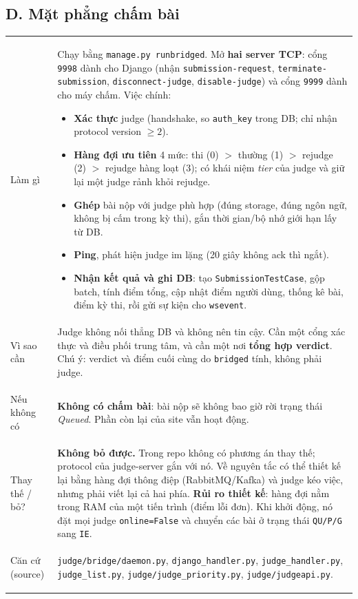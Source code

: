 \documentclass[11pt,a4paper]{article}
\makeatletter
\renewcommand{\c}[1]{\texttt{#1}}
\newcommand{\comp}[6]{%
\begin{tcolorbox}[enhanced,breakable,colback=white,colframe=black!55,boxrule=0.5pt,arc=2pt,
  title={\textbf{#1}},fonttitle=\large,left=4pt,right=4pt,top=3pt,bottom=3pt]
\begin{tabularx}{\linewidth}{@{}>{\bfseries\raggedright}p{2.7cm}X@{}}
Làm gì & #2 \\[2pt]
Vì sao cần & #3 \\[2pt]
Nếu không có & #4 \\[2pt]
Thay thế / bỏ? & #5 \\[2pt]
Căn cứ (source) & \small #6 \\
\end{tabularx}
\end{tcolorbox}}
\makeatother
\begin{document}
\subsection*{D. Mặt phẳng chấm bài}

\comp{D1. \c{bridged} (cầu nối chấm bài)}
{Chạy bằng \c{manage.py runbridged}. Mở \textbf{hai server TCP}: cổng \c{9998} dành cho Django (nhận \c{submission-request}, \c{terminate-submission}, \c{disconnect-judge}, \c{disable-judge}) và cổng \c{9999} dành cho máy chấm. Việc chính:
\begin{itemize}[nosep,leftmargin=1.2em]
\item \textbf{Xác thực} judge (handshake, so \c{auth\_key} trong DB; chỉ nhận protocol version $\ge 2$).
\item \textbf{Hàng đợi ưu tiên} 4 mức: thi (0) $>$ thường (1) $>$ rejudge (2) $>$ rejudge hàng loạt (3); có khái niệm \emph{tier} của judge và giữ lại một judge rảnh khỏi rejudge.
\item \textbf{Ghép} bài nộp với judge phù hợp (đúng storage, đúng ngôn ngữ, không bị cấm trong kỳ thi), gắn thời gian/bộ nhớ giới hạn lấy từ DB.
\item \textbf{Ping}, phát hiện judge im lặng (20 giây không ack thì ngắt).
\item \textbf{Nhận kết quả và ghi DB}: tạo \c{SubmissionTestCase}, gộp batch, tính điểm tổng, cập nhật điểm người dùng, thống kê bài, điểm kỳ thi, rồi gửi sự kiện cho \c{wsevent}.
\end{itemize}}
{Judge không nối thẳng DB và không nên tin cậy. Cần một cổng xác thực và điều phối trung tâm, và cần một nơi \textbf{tổng hợp verdict}. Chú ý: verdict và điểm cuối cùng do \c{bridged} tính, không phải judge.}
{\textbf{Không có chấm bài}: bài nộp sẽ không bao giờ rời trạng thái \emph{Queued}. Phần còn lại của site vẫn hoạt động.}
{\textbf{Không bỏ được.} Trong repo không có phương án thay thế; protocol của judge-server gắn với nó. Về nguyên tắc có thể thiết kế lại bằng hàng đợi thông điệp (RabbitMQ/Kafka) và judge kéo việc, nhưng phải viết lại cả hai phía. \textbf{Rủi ro thiết kế}: hàng đợi nằm trong RAM của một tiến trình (điểm lỗi đơn). Khi khởi động, nó đặt mọi judge \c{online=False} và chuyển các bài ở trạng thái \c{QU/P/G} sang \c{IE}.}
{\c{judge/bridge/daemon.py}, \c{django\_handler.py}, \c{judge\_handler.py}, \c{judge\_list.py}, \c{judge/judge\_priority.py}, \c{judge/judgeapi.py}.}
\end{document}
